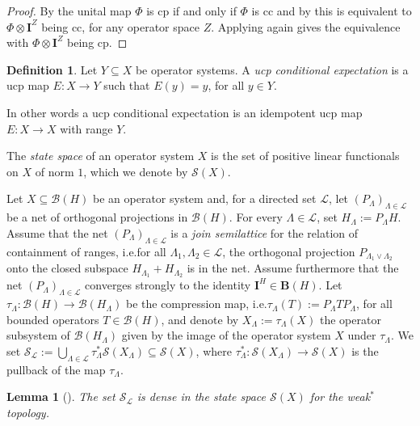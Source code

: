\documentclass{amsart}
\theoremstyle{plain}
\newtheorem{lemma}[theorem]{Lemma}
\theoremstyle{definition}
\newtheorem{definition}[theorem]{Definition}
\theoremstyle{remark}
\begin{document}
	\begin{proof}
		By \cite[Corollary 5.1.2]{ER20} the unital map $\Phi$ is cp if and only if $\Phi$ is cc and by \cite[Proposition 2.1.1]{Pis03} this is equivalent to $\Phi \otimes \mathbf{I}^Z$ being cc, for any operator space $Z$.
		Applying \cite[Corollary 5.1.2]{ER20} again gives the equivalence with $\Phi \otimes \mathbf{I}^Z$ being cp.
	\end{proof}	
	
	\begin{definition}
		Let $Y \subseteq X$ be operator systems.
		A \emph{ucp conditional expectation} is a ucp map $E : X \rightarrow Y$ such that $E(y) = y$, for all $y \in Y$.
	\end{definition}
	
	In other words a ucp conditional expectation is an idempotent ucp map $E : X \rightarrow X$ with range $Y$.
	
	The \emph{state space} of an operator system $X$ is the set of positive linear functionals on $X$ of norm $1$, which we denote by $\mathcal{S}(X)$.
	
	Let $X \subseteq \mathcal{B}(H)$ be an operator system and, for a directed set $\mathcal{L}$, let $(P_\Lambda)_{\Lambda \in \mathcal{L}}$ be a net of orthogonal projections in $\mathcal{B}(H)$.
	For every $\Lambda \in \mathcal{L}$, set $H_\Lambda := P_\Lambda H$.
	Assume that the net $(P_\Lambda)_{\Lambda \in \mathcal{L}}$ is a \emph{join semilattice} for the relation of containment of ranges, i.e.\@ for all $\Lambda_1, \Lambda_2 \in \mathcal{L}$, the orthogonal projection $P_{\Lambda_1 \vee \Lambda_2}$ onto the closed subspace $H_{\Lambda_1} + H_{\Lambda_2}$ is in the net. 
	Assume furthermore that the net $(P_\Lambda)_{\Lambda \in \mathcal{L}}$  converges strongly to the identity $\mathbf{I}^H \in \mathbf{B}(H)$.
	Let $\tau_\Lambda : \mathcal{B}(H) \rightarrow \mathcal{B}(H_\Lambda)$ be the compression map, i.e.\@ $\tau_\Lambda(T) := P_\Lambda T P_\Lambda$, for all bounded operators $T \in \mathcal{B}(H)$, and denote by $X_\Lambda := \tau_\Lambda(X)$ the operator subsystem of $\mathcal{B}(H_\Lambda)$ given by the image of the operator system $X$ under $\tau_\Lambda$.
	We set $\mathcal{S}_\mathcal{L} := \bigcup_{\Lambda \in \mathcal{L}} \tau_\Lambda^* \mathcal{S}(X_\Lambda) \subseteq \mathcal{S}(X)$, where $\tau_\Lambda^* : \mathcal{S}(X_\Lambda) \rightarrow \mathcal{S}(X)$ is the pullback of the map $\tau_\Lambda$.
	
	\begin{lemma}[{\cite[Proposition 15]{GEvS23}}]\label{lem:Weak*-Density-Of-Liftable-States}
		The set $\mathcal{S}_\mathcal{L}$ is dense in the state space $\mathcal{S}(X)$ for the weak$^*$ topology.
	\end{lemma}
	
\end{document}
